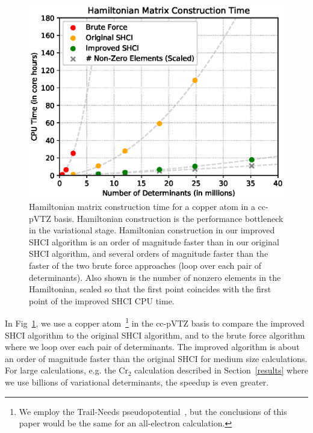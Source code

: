 \documentclass[%
preprint,
 superscriptaddress,
 amsmath,amssymb,
 aps,
]{revtex4-1}
\begin{document}
\begin{figure}
  \includegraphics[width=\linewidth]{speedup/speedup.eps}
  \caption{Hamiltonian matrix construction time for a copper atom in a cc-pVTZ basis. Hamiltonian construction is the performance bottleneck in the variational stage.
Hamiltonian construction in our improved SHCI algorithm is an order of magnitude faster than in
our original SHCI algorithm, and several orders of magnitude faster than the faster of the two brute force
approaches (loop over each pair of determinants).
Also shown is the number of nonzero elements in the Hamiltonian, scaled so that the first point coincides with
the first point of the improved SHCI CPU time.}
  \label{fig:ham}
\end{figure}

In Fig~\ref{fig:ham}, we use a copper atom~\footnote{We employ the Trail-Needs pseudopotential~\cite{TraNee-JCP-15},
but the conclusions of this paper would be the same for an all-electron calculation.}
in the cc-pVTZ basis to compare the improved SHCI algorithm to the original SHCI algorithm,
and to the brute force algorithm where we loop over each pair of determinants.
The improved algorithm
is about an order of magnitude faster than the original SHCI for medium size calculations.
For large calculations, e.g. the Cr$_2$ calculation described in Section~\ref{results}
where we use billions of variational determinants, the speedup is even greater.
\end{document}
